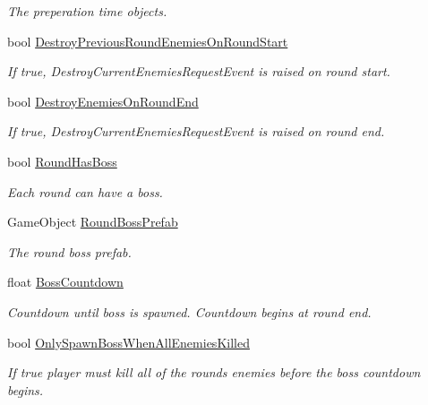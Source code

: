 \begin{DoxyCompactItemize}
\begin{DoxyCompactList}\small\item\em The preperation time objects. \end{DoxyCompactList}\item 
bool \hyperlink{class_round_manager_1_1_round_a037f0609ebfdf5eb6c72be5c9678761d}{Destroy\+Previous\+Round\+Enemies\+On\+Round\+Start}
\begin{DoxyCompactList}\small\item\em If true, Destroy\+Current\+Enemies\+Request\+Event is raised on round start. \end{DoxyCompactList}\item 
bool \hyperlink{class_round_manager_1_1_round_a29453a323d20cb447104b57007feba6b}{Destroy\+Enemies\+On\+Round\+End}
\begin{DoxyCompactList}\small\item\em If true, Destroy\+Current\+Enemies\+Request\+Event is raised on round end. \end{DoxyCompactList}\item 
bool \hyperlink{class_round_manager_1_1_round_a3e8205a74f196546906314f802f41127}{Round\+Has\+Boss}
\begin{DoxyCompactList}\small\item\em Each round can have a boss. \end{DoxyCompactList}\item 
Game\+Object \hyperlink{class_round_manager_1_1_round_aebfe780553ec7d96b138eaf9e703629b}{Round\+Boss\+Prefab}
\begin{DoxyCompactList}\small\item\em The round boss prefab. \end{DoxyCompactList}\item 
float \hyperlink{class_round_manager_1_1_round_a468cf0f58dd938b9c1f327f55313e71a}{Boss\+Countdown}
\begin{DoxyCompactList}\small\item\em Countdown until boss is spawned. Countdown begins at round end. \end{DoxyCompactList}\item 
bool \hyperlink{class_round_manager_1_1_round_ac82296cb0b990188a4a1426cb07c1bb7}{Only\+Spawn\+Boss\+When\+All\+Enemies\+Killed}
\begin{DoxyCompactList}\small\item\em If true player must kill all of the rounds enemies before the boss countdown begins. \end{DoxyCompactList}\item 

\end{DoxyCompactItemize}
